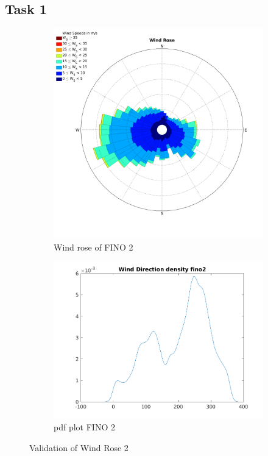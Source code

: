 \documentclass[10pt]{article}
\begin{document}
\subsection{Task 1}
\begin{figure}[H]
\begin{subfigure}{0.5\textwidth}
  \centering
  \includegraphics[width=1\linewidth]{../figures/WindRose_Fino2.png}
  \caption{Wind rose of FINO 2}
\end{subfigure}
\begin{subfigure}{0.5\textwidth}
  \centering
  \includegraphics[width=1\linewidth]{../figures/Validation_WindRose_Fino2.png}
  \caption{pdf plot FINO 2}
\end{subfigure}
  \caption{Validation of Wind Rose 2}
\label{fig:WindroseValidation2}
\end{figure}
\end{document}
